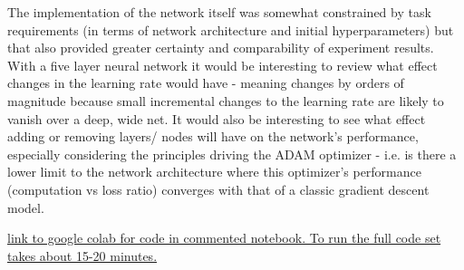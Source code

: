 \documentclass{article}
\begin{document}
The implementation of the network itself was somewhat constrained by task requirements (in terms of network architecture and initial hyperparameters) but that also provided greater certainty and comparability of experiment results.  With a five layer neural network it would be interesting to review what effect changes in the learning rate would have - meaning changes by orders of magnitude because small incremental changes to the learning rate are likely to vanish over a deep, wide net.  It would also be interesting to see what effect adding or removing layers/ nodes will have on the network's performance, especially considering the principles driving the ADAM optimizer - i.e. is there a lower limit to the network architecture where this optimizer's performance (computation vs loss ratio) converges with that of a classic gradient descent model.  




\href{https://colab.research.google.com/drive/1BUnehEmPFwtadZKYoK-uPDQOPtKUG7l3?usp=sharing}{link to google colab for code in commented notebook.  To run the full code set takes about 15-20 minutes.} 
\end{document}
